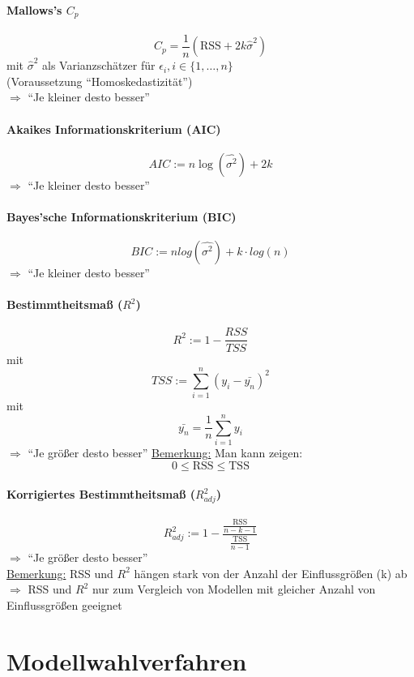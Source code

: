 
\paragraph{Mallows's $C_p$}
\[ C_p = \frac{1}{n}(\text{RSS} + 2k \hat{\sigma}^{2}) \]
mit $\hat{\sigma}^{2}$ als Varianzschätzer für $\epsilon_i , i \in \{1,\dots,n\}$ \\
(Voraussetzung ``Homoskedastizität'')\\
$\Rightarrow$ ``Je kleiner desto besser''
\paragraph{Akaikes Informationskriterium (AIC) }
\[
AIC := n \log (\hat{\sigma^2}) + 2k
\]
$\Rightarrow$ ``Je kleiner desto besser''

\paragraph{Bayes'sche Informationskriterium (BIC)}
\[ BIC := n log (\hat{\sigma^2}) + k \cdot log(n) \]
$\Rightarrow$ ``Je kleiner desto besser''

\paragraph{Bestimmtheitsmaß ($R^2$)}
\[ R^2 := 1 - \frac{RSS}{TSS} \]
mit 
\[ TSS := \sum\limits_{i=1}^n (y_i - \bar{y_n} )^2 \]
mit
\[ \bar{y_n} = \frac{1}{n} \sum\limits_{i=1}^{n}y_i \]
$\Rightarrow$ ``Je größer desto besser''
\underline{Bemerkung:} Man kann zeigen:
\[ 0 \leq \text{RSS} \leq \text{TSS} \]

\paragraph{Korrigiertes Bestimmtheitsmaß ($R^{2}_{adj}$)}
\[ R_{adj}^{2} := 1 - \frac{\frac{\text{RSS}}{n-k-1}}{\frac{\text{TSS}}{n-1}} \]
$\Rightarrow$ ``Je größer desto besser'' \\
\underline{Bemerkung:} RSS und $R^{2}$ hängen stark von der Anzahl der Einflussgrößen (k) ab\\
$\Rightarrow$ RSS und $R^{2}$ nur zum Vergleich von Modellen mit gleicher Anzahl von Einflussgrößen geeignet

\section{Modellwahlverfahren}
